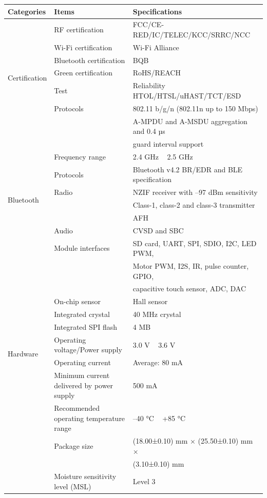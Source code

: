 \documentclass[a4paper]{report}
\begin{document}
{\begin{table}[htbp]
  \hspace{-2.2cm} %
  \begin{tabular}{|l|l|l|}
    \hline
    \textbf{Categories} & \textbf{Items} & \textbf{Specifications} \\
    \hline
    \multirow{7}{*}{Certification} & RF certification & FCC/CE-RED/IC/TELEC/KCC/SRRC/NCC \\
     & Wi-Fi certification & Wi-Fi Alliance \\
     & Bluetooth certification & BQB \\
     & Green certification & RoHS/REACH \\
     & Test & Reliability HTOL/HTSL/uHAST/TCT/ESD \\
    \hline
    \multirow{3}{*}{Wi-Fi} & Protocols & 802.11 b/g/n (802.11n up to 150 Mbps) \\
     & & A-MPDU and A-MSDU aggregation and 0.4 µs\\ & & guard interval support \\
     & Frequency range & 2.4 GHz ~ 2.5 GHz \\
    \hline
    \multirow{5}{*}{Bluetooth} & Protocols & Bluetooth v4.2 BR/EDR and BLE specification \\
     & Radio & NZIF receiver with –97 dBm sensitivity \\
     & & Class-1, class-2 and class-3 transmitter \\
     & & AFH \\
     & Audio & CVSD and SBC \\
    \hline
    \multirow{12}{*}{Hardware} & Module interfaces & SD card, UART, SPI, SDIO, I2C, LED PWM,\\ & & Motor PWM, I2S, IR, pulse counter, GPIO,\\ & & capacitive touch sensor, ADC, DAC \\
     & On-chip sensor & Hall sensor \\
     & Integrated crystal & 40 MHz crystal \\
     & Integrated SPI flash & 4 MB \\
     & Operating voltage/Power supply & 3.0 V ~ 3.6 V \\
     & Operating current & Average: 80 mA \\
     & Minimum current delivered by power supply & 500 mA \\
     & Recommended operating temperature range & –40 °C ~ +85 °C \\
     & Package size & (18.00±0.10) mm × (25.50±0.10) mm × \\ & &(3.10±0.10) mm \\
     & Moisture sensitivity level (MSL) & Level 3 \\
    \hline
  \end{tabular}
\end{table}
}
\end{document}
